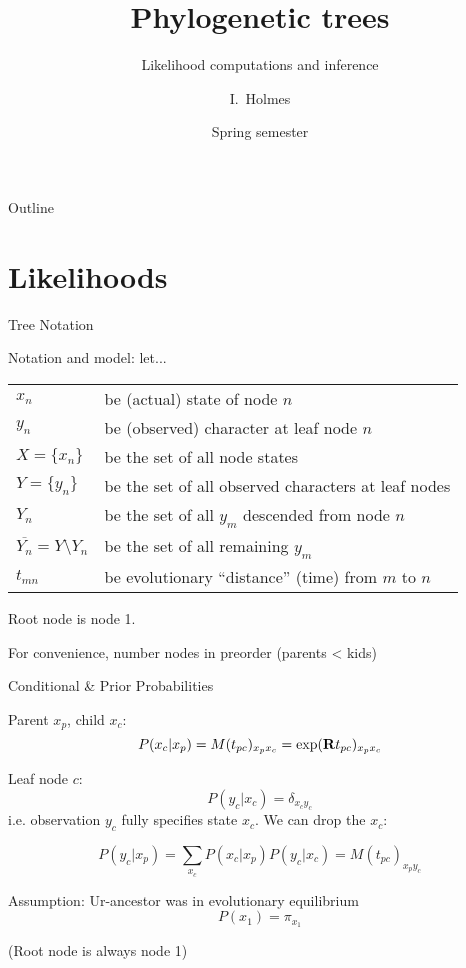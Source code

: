 \documentclass{beamer}
\title[Trees] %
{Phylogenetic trees}
\subtitle
{Likelihood computations and inference} %
\author%
{I.~Holmes} %
\institute[University of California, Berkeley] %
{
  Department of Bioengineering\\
  University of California, Berkeley}
\date%
{Spring semester}
\begin{document}
\begin{frame}
  \titlepage
\end{frame}

\begin{frame}{Outline}
  \tableofcontents
\end{frame}


\section{Likelihoods}

\newcommand\rootpi{\pi_{x_1}}
\newcommand\mxx[2]{M(t_{#1#2})_{x_{#1} x_{#2}}}
\newcommand\mxy[2]{M(t_{#1#2})_{x_{#1} y_{#2}}}
\newcommand\xydelta[1]{\delta_{x_{#1} y_{#1}}}

\begin{frame}{Tree Notation}

Notation and model: let...
\vspace{\baselineskip}

\begin{tabular}{ll}
 $x_n$ & be (actual) state of node $n$ \\
 $y_n$ & be (observed) character at leaf node $n$ \\
 $X = \{x_n\}$ & be the set of all node states \\
 $Y = \{ y_n \}$ & be the set of all observed characters at leaf nodes \\
 $Y_n$ & be the set of all $y_m$ descended from node $n$ \\
 $\overline{Y_n} = Y \setminus Y_n$ & be the set of all remaining $y_m$ \\
 $t_{mn}$ & be evolutionary ``distance'' (time) from $m$ to $n$
\end{tabular}

\vspace{\baselineskip}
Root node is node 1.

For convenience, number nodes in \alert{preorder} (parents < kids)

\end{frame}

\begin{frame}{Conditional \& Prior Probabilities}

Parent $x_p$, child $x_c$:
\[
P(x_c|x_p) = \mxx{p}{c} = \exp({\bf R}t_{pc})_{x_p x_c}
\]

Leaf node $c$:
\[
P(y_c|x_c) = \delta_{x_c y_c}
\]
i.e. observation $y_c$ fully specifies state $x_c$.
We can drop the $x_c$:

\[
P(y_c|x_p) = \sum_{x_c} P(x_c|x_p) P(y_c|x_c) = \mxy{p}{c}
\]

Assumption: Ur-ancestor was in evolutionary equilibrium
\[
P(x_1) = \pi_{x_1}
\]

(Root node is always node 1)

\end{frame}
\end{document}
